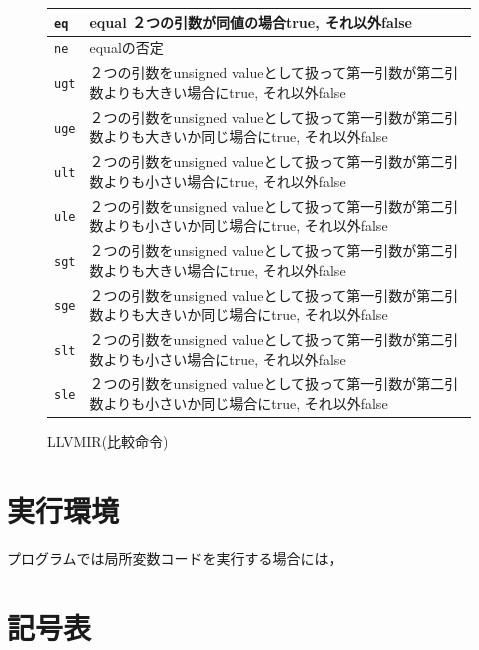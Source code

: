 \documentclass[dvipdfmx,a4j]{jbook}
\begin{document}
\begin{figure}[H]
\begin{center}
  {\scriptsize
\begin{tabularx}{\textwidth}{|l|X|}\hline
{\tt eq} & 
equal ２つの引数が同値の場合true, それ以外false\\\hline
{\tt ne} & equalの否定\\\hline
{\tt ugt} & ２つの引数をunsigned valueとして扱って第一引数が第二引数よりも大きい場合にtrue, それ以外false\\\hline
{\tt uge} & ２つの引数をunsigned valueとして扱って第一引数が第二引数よりも大きいか同じ場合にtrue, それ以外false\\\hline
{\tt ult} & ２つの引数をunsigned valueとして扱って第一引数が第二引数よりも小さい場合にtrue, それ以外false\\\hline
{\tt ule} & ２つの引数をunsigned valueとして扱って第一引数が第二引数よりも小さいか同じ場合にtrue, それ以外false\\\hline
{\tt sgt} & ２つの引数をunsigned valueとして扱って第一引数が第二引数よりも大きい場合にtrue, それ以外false\\\hline
{\tt sge} & ２つの引数をunsigned valueとして扱って第一引数が第二引数よりも大きいか同じ場合にtrue, それ以外false\\\hline
{\tt slt} & ２つの引数をunsigned valueとして扱って第一引数が第二引数よりも小さい場合にtrue, それ以外false\\\hline
{\tt sle} & ２つの引数をunsigned valueとして扱って第一引数が第二引数よりも小さいか同じ場合にtrue, それ以外false\\\hline
\end{tabularx}
}
\end{center}
\caption{LLVMIR(比較命令)}
\end{figure}

\section{実行環境}

プログラムでは局所変数コードを実行する場合には，

\section{記号表}
\end{document}
